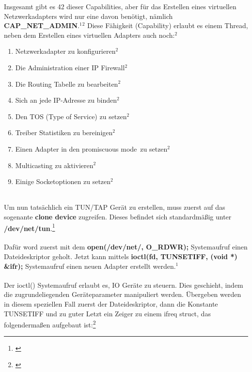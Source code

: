 Insgesamt gibt es 42 dieser Capabilities, aber für das Erstellen eines virtuellen Netzwerkadapters wird nur eine davon benötigt, nämlich \textbf{CAP\_NET\_ADMIN}.$^{1}$$^{2}$ Diese Fähigkeit (Capability) erlaubt es einem Thread, neben dem Erstellen eines virtuellen Adapters auch noch:$^{2}$
\\
\begin{enumerate}
    \item Netzwerkadapter zu konfigurieren$^{2}$
    \item Die Administration einer IP Firewall$^{2}$
    \item Die Routing Tabelle zu bearbeiten$^{2}$
    \item Sich an jede IP-Adresse zu binden$^{2}$
    \item Den TOS (Type of Service) zu setzen$^{2}$
    \item Treiber Statistiken zu bereinigen$^{2}$
    \item Einen Adapter in den \dq promiscuous mode\dq \ zu setzen$^{2}$
    \item Multicasting zu aktivieren$^{2}$
    \item Einige Socketoptionen zu setzen$^{2}$
\end{enumerate} 
\ \\
\newpage
\noindent
Um nun tatsächlich ein TUN/TAP Gerät zu erstellen, muss zuerst auf das sogenante \textbf{clone device} zugreifen. Dieses befindet sich standardmäßig unter \textbf{/dev/net/tun}.\footnote[1]{\cite[Vgl.][]{TUNTAP}}
\\\\
Dafür word zuerst mit dem \textbf{open(\dq/dev/net/\dq, O\_RDWR);} Systemaufruf einen Dateideskriptor geholt. Jetzt kann mittels \textbf{ioctl(fd, TUNSETIFF, (void *) \&ifr);} Systemaufruf einen neuen Adapter erstellt werden.$^{1}$
\\\\
Der ioctl() Systemaufruf erlaubt es, IO Geräte zu steuern. Dies geschieht, indem die zugrundeliegenden Geräteparameter manipuliert werden. Übergeben werden in diesem speziellen Fall zuerst der Dateideskriptor, dann die Konstante TUNSETIFF und zu guter Letzt ein Zeiger zu einem ifreq struct, das folgendermaßen aufgebaut ist:\footnote[2]{\cite[Vgl.][]{SRV9}}

